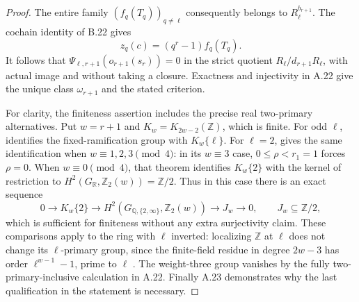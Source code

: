 \begin{proof}
The entire family $(f_q(T_q))_{q\ne\ell}$ consequently belongs
to $R_\ell^{b_{r+1}}$. The cochain identity of B.22 gives
\[
 z_q(c)=(q^r-1)f_q(T_q).
\]
It follows that $\Psi_{\ell,r+1}(o_{r+1}(s_r))=0$ in the
strict quotient $R_\ell/d_{r+1}R_\ell$, with actual image and
without taking a closure. Exactness and injectivity in A.22 give
the unique class $\omega_{r+1}$ and the stated criterion.

For clarity, the finiteness assertion includes the precise real
two-primary alternatives. Put $w=r+1$ and $K_w=K_{2w-2}(\mathbb Z)$,
which is finite. For odd $\ell$, \cite[VI.8.2]{CohWeibelKbook}
identifies the fixed-ramification group with $K_w\{\ell\}$.
For $\ell=2$, \cite[VI.9.11, author p.57]{CohWeibelKbook}
gives the same identification when $w\equiv1,2,3\pmod4$:
in its $w\equiv3$ case, $0\leq\rho<r_1=1$ forces $\rho=0$.
When $w\equiv0\pmod4$, that theorem identifies $K_w\{2\}$
with the kernel of restriction to
$H^2(G_{\mathbb R},\mathbb Z_2(w))=\mathbb Z/2$.
Thus in this case there is an exact sequence
\[
 0\to K_w\{2\}\to H^2(G_{\mathbb Q,\{2,\infty\}},
                  \mathbb Z_2(w))\to J_w\to0,
       \qquad J_w\subseteq\mathbb Z/2,
\]
which is sufficient for finiteness without any extra surjectivity claim.
These comparisons apply to the ring with $\ell$ inverted:
localizing $\mathbb Z$ at $\ell$ does not change its
$\ell$-primary group, since the finite-field residue in degree
$2w-3$ has order $\ell^{w-1}-1$, prime to $\ell$
\cite[IV.1.13; V.6.8]{CohWeibelKbook}.
The weight-three group vanishes by the fully two-primary-inclusive
calculation in A.22. Finally A.23 demonstrates why the last
qualification in the statement is necessary.
\end{proof}

